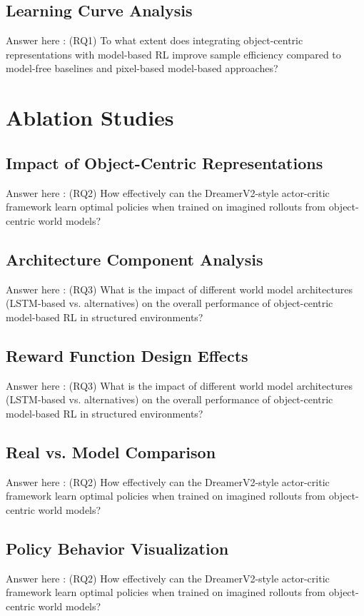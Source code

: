 \documentclass[
	english,
	ruledheaders=section,
	class=report,
	thesis={type=master},
	accentcolor=9c,
	custommargins=true,
	marginpar=false,
	parskip=half-,
	fontsize=11pt,
]{tudapub}
\begin{document}
\subsection{Learning Curve Analysis}
\label{subsec:learning_curves}
Answer here : (RQ1) To what extent does integrating object-centric representations with model-based RL improve sample efficiency compared to model-free baselines and pixel-based model-based approaches?

\section{Ablation Studies}
\label{sec:ablation_studies}

\subsection{Impact of Object-Centric Representations}
\label{subsec:oc_impact}
Answer here : (RQ2) How effectively can the DreamerV2-style actor-critic framework learn optimal policies when trained on imagined rollouts from object-centric world models?

\subsection{Architecture Component Analysis}
\label{subsec:architecture_analysis}
Answer here : (RQ3) What is the impact of different world model architectures (LSTM-based vs. alternatives) on the overall performance of object-centric model-based RL in structured environments?

\subsection{Reward Function Design Effects}
\label{subsec:reward_effects}
Answer here : (RQ3) What is the impact of different world model architectures (LSTM-based vs. alternatives) on the overall performance of object-centric model-based RL in structured environments?

\subsection{Real vs. Model Comparison}
\label{subsec:real_vs_model}
Answer here : (RQ2) How effectively can the DreamerV2-style actor-critic framework learn optimal policies when trained on imagined rollouts from object-centric world models?

\subsection{Policy Behavior Visualization}
\label{subsec:policy_visualization}
Answer here : (RQ2) How effectively can the DreamerV2-style actor-critic framework learn optimal policies when trained on imagined rollouts from object-centric world models?
\end{document}
